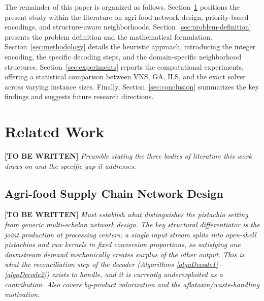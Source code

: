 \documentclass[preprint,12pt,authoryear]{elsarticle}
\begin{document}
The remainder of this paper is organized as follows. Section~\ref{sec:related-work} positions the present study within the literature on agri-food network design,
priority-based encodings, and structure-aware neighborhoods. Section~\ref{sec:problem-definition} presents the problem definition and the mathematical formulation. Section~\ref{sec:methodology}
details the heuristic approach, introducing the integer encoding, the specific decoding steps, and the domain-specific neighborhood structures. Section~\ref{sec:experiments}
reports the computational experiments, offering a statistical comparison between VNS, GA, ILS, and the exact solver across varying instance sizes. Finally, Section~\ref{sec:conclusion}
summarizes the key findings and suggests future research directions.

\section{Related Work}
\label{sec:related-work}

\textbf{[TO BE WRITTEN]} \textit{Preamble stating the three bodies of literature this work draws on and the specific gap it addresses.}

\subsection{Agri-food Supply Chain Network Design}
\label{subsec:rw_agrifood}

\textbf{[TO BE WRITTEN]} \textit{Must establish what distinguishes the pistachio setting from generic multi-echelon network design. The key structural
differentiator is the joint production at processing centers: a single input stream splits into open-shell pistachios and raw kernels in fixed conversion
proportions, so satisfying one downstream demand mechanically creates surplus of the other output. This is what the reconciliation step of the decoder
(Algorithms \ref{algoDecode1}--\ref{algoDecode2}) exists to handle, and it is currently underexploited as a contribution. Also covers by-product valorization
and the aflatoxin/waste-handling motivation.}
\end{document}
